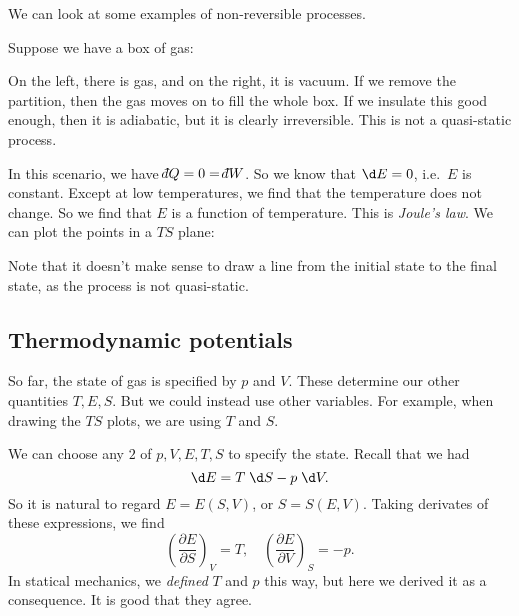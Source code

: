 \documentclass[a4paper]{article}
\def\di{{\mathchar'26\mkern-12mu d}}
\begin{document}
We can look at some examples of non-reversible processes.
\begin{eg}
  Suppose we have a box of gas:
  \begin{center}
  \end{center}
  On the left, there is gas, and on the right, it is vacuum. If we remove the partition, then the gas moves on to fill the whole box. If we insulate this good enough, then it is adiabatic, but it is clearly irreversible. This is not a quasi-static process.

  In this scenario, we have $\di Q = 0 = \di W$. So we know that $\d E = 0$, i.e.\ $E$ is constant. Except at low temperatures, we find that the temperature does not change. So we find that $E$ is a function of temperature. This is \emph{Joule's law}. We can plot the points in a $TS$ plane:
  \begin{center}
  \end{center}
  Note that it doesn't make sense to draw a line from the initial state to the final state, as the process is not quasi-static.
\end{eg}

\subsection{Thermodynamic potentials}
So far, the state of gas is specified by $p$ and $V$. These determine our other quantities $T, E, S$. But we could instead use other variables. For example, when drawing the $TS$ plots, we are using $T$ and $S$.

We can choose any $2$ of $p, V, E, T, S$ to specify the state. Recall that we had
\[
  \d E = T \;\d S - p \;\d V.
\]
So it is natural to regard $E = E(S, V)$, or $S = S(E, V)$. Taking derivates of these expressions, we find
\[
  \left(\frac{\partial E}{\partial S}\right)_V = T,\quad \left(\frac{\partial E}{\partial V}\right)_S = -p.
\]
In statical mechanics, we \emph{defined} $T$ and $p$ this way, but here we derived it as a consequence. It is good that they agree.
\end{document}
